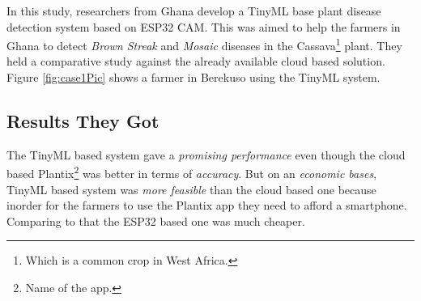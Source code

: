 \documentclass[../../main]{subfiles}
\begin{document}
In this study\cite{ieee01africa}, researchers from Ghana develop a TinyML base plant
disease detection system based on ESP32 CAM. This was aimed to help the farmers
in Ghana to detect \emph{Brown Streak} and \emph{Mosaic} diseases in the
Cassava\footnote{Which is a common crop in West Africa.} plant. They held a comparative
study against the already available cloud based solution. Figure \ref{fig:case1Pic}
shows a farmer in Berekuso using the TinyML system.

\subsection{Results They Got}

The TinyML based system gave a \emph{promising performance} even though the
cloud based Plantix\footnote{Name of the app.} was better in terms of \emph{accuracy}.
But on an \emph{economic bases}, TinyML based system was \emph{more feasible} than the
cloud based one because inorder for the farmers to use the Plantix app they need to
afford a smartphone. Comparing to that the ESP32 based one was much cheaper.
\end{document}
